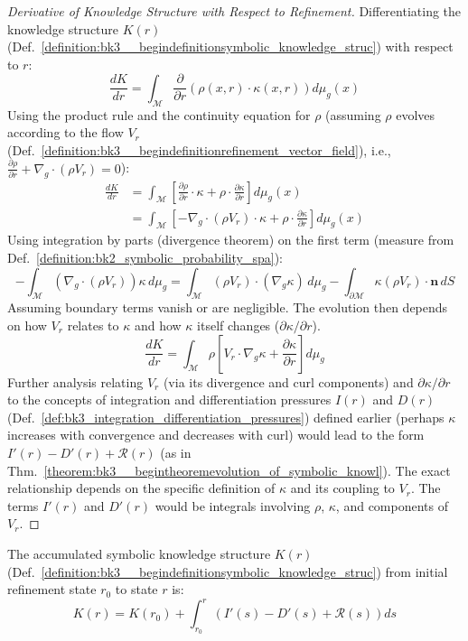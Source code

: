 \begin{proof}[Derivative of Knowledge Structure with Respect to Refinement]
\label{proof:bk3_differentiation_knowledge_structure}
Differentiating the knowledge structure $K(r)$ (Def.~\ref{definition:bk3__begindefinitionsymbolic_knowledge_struc}) with respect to $r$:
\[
\frac{dK}{dr} = \int_{\mathcal{M}} \frac{\partial}{\partial r}(\rho(x,r) \cdot \kappa(x,r)) d\mu_g(x)
\]
Using the product rule and the continuity equation for $\rho$ (assuming $\rho$ evolves according to the flow $V_r$ (Def.~\ref{definition:bk3__begindefinitionrefinement_vector_field}), i.e., $\frac{\partial \rho}{\partial r} + \nabla_g \cdot (\rho V_r) = 0$):
\begin{align*}
\frac{dK}{dr} &= \int_{\mathcal{M}} \left[ \frac{\partial \rho}{\partial r} \cdot \kappa + \rho \cdot \frac{\partial \kappa}{\partial r} \right] d\mu_g(x) \\
&= \int_{\mathcal{M}} \left[ -\nabla_g \cdot (\rho V_r) \cdot \kappa + \rho \cdot \frac{\partial \kappa}{\partial r} \right] d\mu_g(x)
\end{align*}
Using integration by parts (divergence theorem) on the first term (measure from Def.~\ref{definition:bk2_symbolic_probability_spa}):
\[
-\int_{\mathcal{M}} (\nabla_g \cdot (\rho V_r)) \kappa \, d\mu_g = \int_{\mathcal{M}} (\rho V_r) \cdot (\nabla_g \kappa) \, d\mu_g - \int_{\partial\mathcal{M}} \kappa (\rho V_r) \cdot \mathbf{n} \, dS
\]
Assuming boundary terms vanish or are negligible. The evolution then depends on how $V_r$ relates to $\kappa$ and how $\kappa$ itself changes ($\partial \kappa / \partial r$).
\[
\frac{dK}{dr} = \int_{\mathcal{M}} \rho \left[ V_r \cdot \nabla_g \kappa + \frac{\partial \kappa}{\partial r} \right] d\mu_g
\]
Further analysis relating $V_r$ (via its divergence and curl components) and $\partial \kappa / \partial r$ to the concepts of integration and differentiation pressures $I(r)$ and $D(r)$ (Def.~\ref{def:bk3_integration_differentiation_pressures}) defined earlier (perhaps $\kappa$ increases with convergence and decreases with curl) would lead to the form $I'(r) - D'(r) + \mathcal{R}(r)$ (as in Thm.~\ref{theorem:bk3__begintheoremevolution_of_symbolic_knowl}). The exact relationship depends on the specific definition of $\kappa$ and its coupling to $V_r$. The terms $I'(r)$ and $D'(r)$ would be integrals involving $\rho$, $\kappa$, and components of $V_r$.
\end{proof}

\begin{corollary} \label{corollary:bk3__begincorollaryintegrated_knowledge_stru}
The accumulated symbolic knowledge structure $K(r)$ (Def.~\ref{definition:bk3__begindefinitionsymbolic_knowledge_struc}) from initial refinement state $r_0$ to state $r$ is:
\[
K(r) = K(r_0) + \int_{r_0}^r (I'(s) - D'(s) + \mathcal{R}(s)) ds
\]
\end{corollary}

